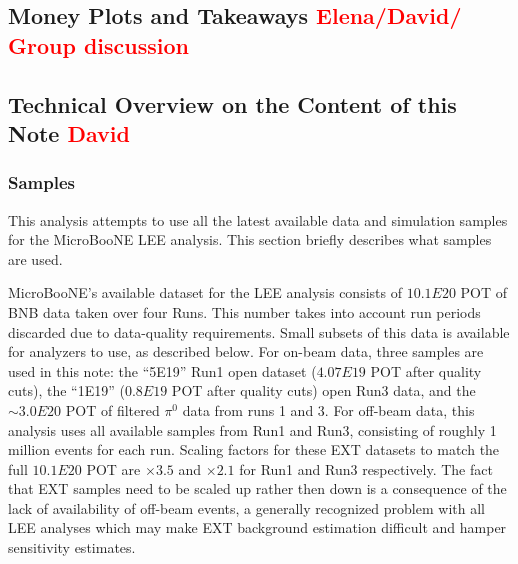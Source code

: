 \documentclass[a4paper]{article}
\begin{document}
\subsection{Money Plots and Takeaways \textcolor{red}{Elena/David/ Group discussion}}

\subsection{Technical Overview on the Content of this Note \textcolor{red}{David}}
\subsubsection{Samples}
\par This analysis attempts to use all the latest available data and simulation samples for the MicroBooNE LEE analysis. This section briefly describes what samples are used.
\par MicroBooNE's available dataset for the LEE analysis consists of $10.1E20$ POT of BNB data taken over four Runs. This number takes into account run periods discarded due to data-quality requirements. Small subsets of this data is available for analyzers to use, as described below.
For on-beam data, three samples are used in this note: the ``5E19'' Run1 open dataset ($4.07E19$ POT after quality cuts), the ``1E19'' ($0.8E19$ POT after quality cuts) open Run3 data, and the $\sim3.0E20$ POT of filtered $\pi^0$ data from runs 1 and 3. For off-beam data, this analysis uses all available samples from Run1 and Run3, consisting of roughly 1 million events for each run. Scaling factors for these EXT datasets to match the full $10.1E20$ POT are $\times3.5$ and $\times2.1$ for Run1 and Run3 respectively. The fact that EXT samples need to be scaled up rather then down is a consequence of the lack of availability of off-beam events, a generally recognized problem with all LEE analyses which may make EXT background estimation difficult and hamper sensitivity estimates.
\end{document}
